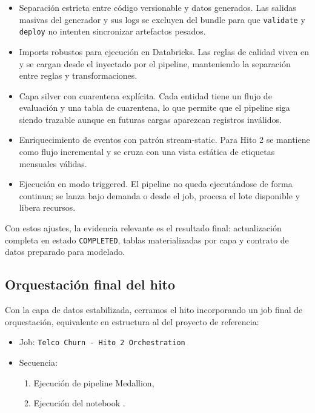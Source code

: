 \documentclass[12pt,a4paper]{article}
\begin{document}
\begin{itemize}
    \item Separación estricta entre código versionable y datos generados. Las salidas masivas del generador y sus logs se excluyen del bundle para que \texttt{validate} y \texttt{deploy} no intenten sincronizar artefactos pesados.
    \item Imports robustos para ejecución en Databricks. Las reglas de calidad viven en  y se cargan desde el  inyectado por el pipeline, manteniendo la separación entre reglas y transformaciones.
    \item Capa silver con cuarentena explícita. Cada entidad tiene un flujo de evaluación y una tabla de cuarentena, lo que permite que el pipeline siga siendo trazable aunque en futuras cargas aparezcan registros inválidos.
    \item Enriquecimiento de eventos con patrón stream-static. Para Hito 2 se mantiene  como flujo incremental y se cruza con una vista estática de etiquetas mensuales válidas.
    \item Ejecución en modo triggered. El pipeline no queda ejecutándose de forma continua; se lanza bajo demanda o desde el job, procesa el lote disponible y libera recursos.
\end{itemize}

Con estos ajustes, la evidencia relevante es el resultado final: actualización completa en estado \texttt{COMPLETED}, tablas materializadas por capa y contrato de datos preparado para modelado.

\subsection{Orquestación final del hito}

Con la capa de datos estabilizada, cerramos el hito incorporando un job final de orquestación, equivalente en estructura al del proyecto de referencia:

\begin{itemize}
    \item Job: \texttt{Telco Churn - Hito 2 Orchestration}
    \item Secuencia:
    \begin{enumerate}
        \item Ejecución de pipeline Medallion,
        \item Ejecución del notebook .
    \end{enumerate}
\end{itemize}
\end{document}

